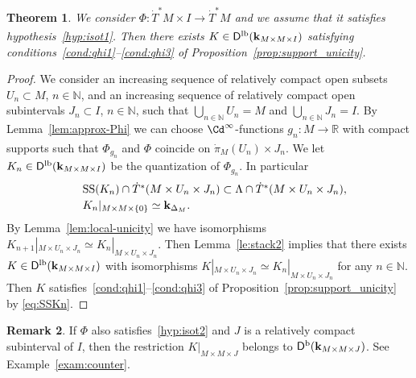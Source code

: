 \documentclass[12pt,leqno]{article}
\newtheorem{theorem}{Theorem}[section]
\theoremstyle{definition}
\newtheorem{remark}[theorem]{Remark}
\newcommand{\N}{{\mathbb{N}}}
\newcommand{\R}{{\mathbb{R}}}
\newcommand{\cor}{{\bf k}}
\renewcommand{\to}[1][]{\xrightarrow[]{#1}}
\newcommand{\cl}{\colon}
\newcommand{\ba}{\begin{array}}
\newcommand{\ea}{\end{array}}
\newcommand{\eq}{\begin{eqnarray}}
\newcommand{\eneq}{\end{eqnarray}}
\newcommand{\Der}[1][]{\mathsf{D}^{#1}}
\newcommand{\Derb}{\Der[\mathrm{b}]}
\newcommand{\Derlb}{\Der[\mathrm{lb}]}
\newcommand{\SSi}{\mathrm{SS}}
\newcommand{\dT}{{\dot{T}}}
\newcommand{\dTM}{{\dT}^*M}
\numberwithin{equation}{section}
\begin{document}
\begin{theorem}\label{th:3}
We consider $\Phi\cl \dTM\times I\to \dTM$ and we assume that it satisfies
hypothesis~\eqref{hyp:isot1}.
Then there exists $K\in\Derlb(\cor_{M\times M\times I})$ satisfying
conditions~\eqref{cond:qhi1}--\eqref{cond:qhi3} of
Proposition~\ref{prop:support_unicity}.
\end{theorem}
\begin{proof}
We consider an increasing sequence of relatively compact open subsets
$U_n \subset M$, $n\in \N$, and an increasing sequence of relatively compact
open subintervals $J_n\subset I$, $n\in \N$, such that
$\bigcup_{n\in \N} U_n = M$ and $\bigcup_{n\in \N} J_n = I$.
By Lemma~\ref{lem:approx-Phi} we can choose $\Cd^\infty$-functions
$g_n\cl M\to \R$ with compact supports such that $\Phi_{g_n}$ and $\Phi$
coincide on $\dot\pi_M(U_n) \times J_n$.
We let $K_n \in \Derlb(\cor_{M\times M\times I})$ be the quantization of
$\Phi_{g_n}$. In particular
\eq
\label{eq:SSKn}
&&\ba{l}
 \SSi(K_n) \cap \dT^*(M\times U_n \times J_n)
 \subset \Lambda \cap \dT^*(M\times U_n \times J_n),  \\[.5ex]
K_n|_{M\times M\times \{0\}} \simeq \cor_{\Delta_M}.
\ea
\eneq
By Lemma~\ref{lem:local-unicity} we have isomorphisms
$K_{n+1}|_{M\times U_n \times J_n}\simeq K_n|_{M\times U_n \times
  J_n}$.
Then Lemma~\ref{le:stack2} implies that
there exists $K\in \Derlb(\cor_{M\times M\times I})$ 
with isomorphisms 
$K|_{M\times U_n \times J_n}\simeq K_n|_{M\times U_n \times J_n}$
for any $n\in \N$.
Then $K$ satisfies~\eqref{cond:qhi1}--\eqref{cond:qhi3} of
Proposition~\ref{prop:support_unicity} by \eqref{eq:SSKn}.
\end{proof}
\begin{remark}\label{rem:compact-case-bounded}
If $\Phi$ also satisfies~\eqref{hyp:isot2} and $J$ is a relatively compact
subinterval of $I$, then the restriction $K|_{M\times M\times J}$ belongs to
$\Derb(\cor_{M\times M\times J})$. See Example~\ref{exam:counter}.
\end{remark}
\end{document}
